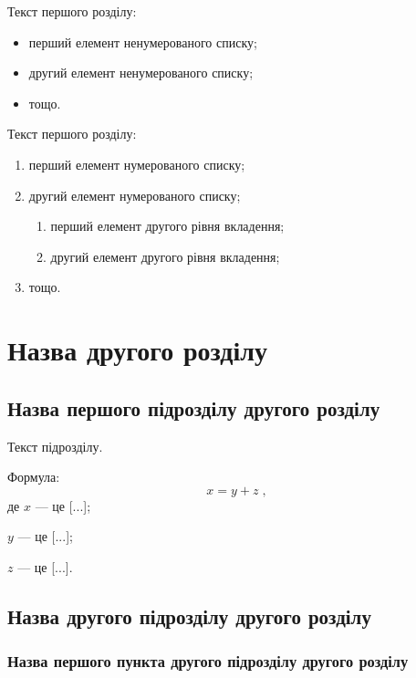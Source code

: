 \documentclass{xedstu}
\begin{document}
Текст першого розділу:
\begin{itemize}
	\item перший елемент ненумерованого списку;
	\item другий елемент ненумерованого списку;
	\item тощо.
\end{itemize}

Текст першого розділу:
\begin{enumerate}
	\item перший елемент нумерованого списку;
	\item другий елемент нумерованого списку;
	\begin{enumerate}
		\item перший елемент другого рівня вкладення;
		\item другий елемент другого рівня вкладення;
	\end{enumerate}
	\item тощо.
\end{enumerate}

\chapter{Назва другого розділу}
\label{chap:second}

\section{Назва першого підрозділу другого розділу}
\label{sec:secondfirst}

Текст підрозділу.

Формула:
\begin{equation}
x = y + z\;,
\label{eq:equation1}
\end{equation}
де $x$ --- це [...];

$y$ --- це [...];

$z$ --- це [...].

\section{Назва другого підрозділу другого розділу}
\label{sec:secondsecond}

\subsection{Назва першого пункта другого підрозділу другого розділу}
\label{subsec:secondsecondfirst}
\end{document}
